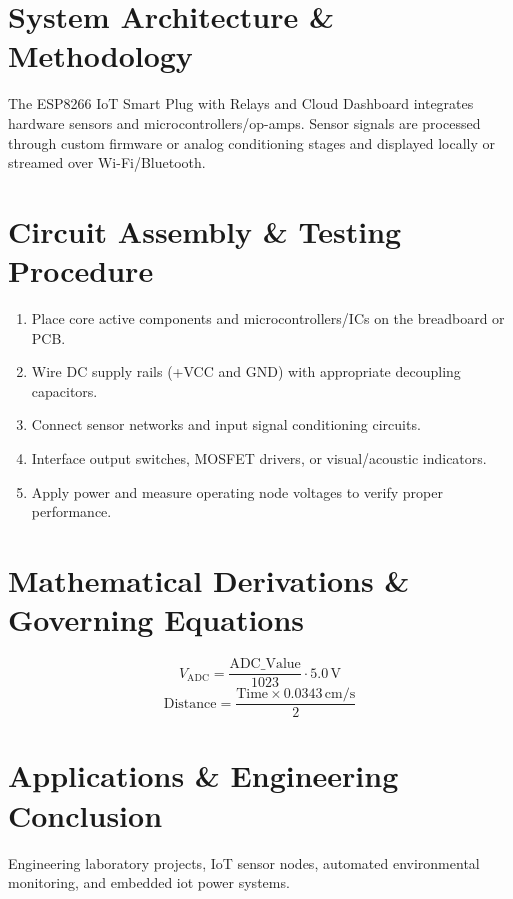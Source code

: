 \documentclass[11pt,a4paper]{article}
\begin{document}
\section{System Architecture \& Methodology}
The ESP8266 IoT Smart Plug with Relays and Cloud Dashboard integrates hardware sensors and microcontrollers/op-amps. Sensor signals are processed through custom firmware or analog conditioning stages and displayed locally or streamed over Wi-Fi/Bluetooth.

\section{Circuit Assembly \& Testing Procedure}
\begin{enumerate}
    \item Place core active components and microcontrollers/ICs on the breadboard or PCB.
    \item Wire DC supply rails (+VCC and GND) with appropriate decoupling capacitors.
    \item Connect sensor networks and input signal conditioning circuits.
    \item Interface output switches, MOSFET drivers, or visual/acoustic indicators.
    \item Apply power and measure operating node voltages to verify proper performance.
\end{enumerate}

\section{Mathematical Derivations \& Governing Equations}
\begin{equation}
V_{\text{ADC}} = \frac{\text{ADC\_Value}}{1023} \cdot 5.0\,\text{V}
\end{equation}
\begin{equation}
\text{Distance} = \frac{\text{Time} \times 0.0343\,\text{cm/s}}{2}
\end{equation}

\section{Applications \& Engineering Conclusion}
Engineering laboratory projects, IoT sensor nodes, automated environmental monitoring, and embedded iot power systems.
\end{document}
